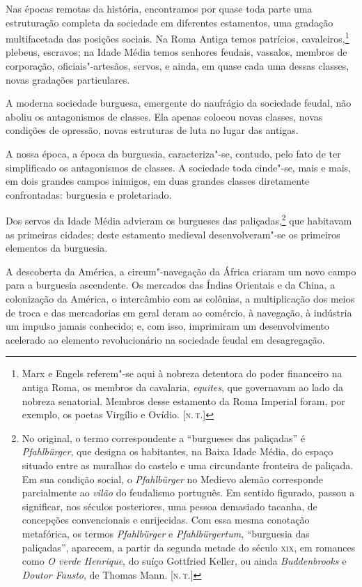 Nas épocas remotas da história, encontramos por quase toda parte
uma estruturação completa da sociedade em diferentes estamentos, uma
gradação multifacetada das posições sociais. Na Roma Antiga temos
patrícios, cavaleiros,\footnote{Marx e Engels referem"-se aqui à nobreza	
detentora do poder financeiro na antiga Roma, os membros da
cavalaria, \textit{equites}, que governavam ao lado da nobreza
senatorial. Membros desse estamento da Roma Imperial foram, por
exemplo, os poetas Virgílio e Ovídio. [\textsc{n.\,t.}]} plebeus, escravos; na 
Idade Média temos senhores feudais, vassalos, membros de corporação, oficiais"-artesãos, 
servos, e ainda, em quase cada uma dessas classes, novas gradações particulares.

A moderna sociedade burguesa, emergente do naufrágio da sociedade
feudal, não aboliu os antagonismos de classes. Ela apenas colocou novas
classes, novas condições de opressão, novas estruturas de luta no lugar
das antigas.

A nossa época, a época da burguesia, caracteriza"-se, contudo, pelo
fato de ter simplificado os antagonismos de classes. A sociedade toda
cinde"-se, mais e mais, em dois grandes campos inimigos, em duas			\label{1}
grandes classes diretamente confrontadas: burguesia e proletariado.

Dos servos da Idade Média advieram os burgueses das   
paliçadas,\footnote{No original, o termo correspondente a ``burgueses das paliçadas'' é\label{8}
\textit{Pfahlbürger}, que designa os habitantes, na Baixa Idade Média,
do espaço situado entre as muralhas do castelo e uma circundante
fronteira de paliçada. Em sua condição social, o \textit{Pfahlbürger}
no Medievo alemão corresponde parcialmente ao \textit{vilão} do feudalismo
português. Em sentido figurado, passou a significar, nos séculos
posteriores, uma pessoa demasiado tacanha, de concepções convencionais
e enrijecidas. Com essa mesma conotação metafórica, os termos
\textit{Pfahlbürger} e \textit{Pfahlbürgertum}, ``burguesia das
paliçadas'', aparecem, a partir da segunda metade do século \textsc{xix}, em
romances como \textit{O verde Henrique}, do suíço Gottfried Keller, ou
ainda \textit{Buddenbrooks} e \textit{Doutor Fausto}, de Thomas
Mann. [\textsc{n.\,t.}]}
que habitavam as primeiras cidades; deste estamento medieval 
desenvolveram"-se os primeiros elementos da burguesia.

A descoberta da América, a circum"-navegação da África criaram um novo
campo para a burguesia ascendente. Os mercados das Índias Orientais e
da China, a colonização da América, o intercâmbio com as colônias, a
multiplicação dos meios de troca e das mercadorias em geral deram ao
comércio, à navegação, à indústria um impulso jamais conhecido; e, com
isso, imprimiram um desenvolvimento acelerado ao elemento
revolucionário na sociedade feudal em desagregação.

